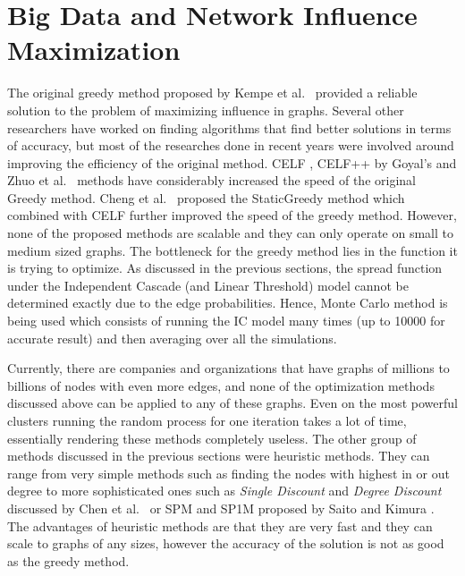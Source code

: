 \documentclass[english]{tktltiki}
\begin{document}
\newpage

\section{Big Data and Network Influence Maximization}
\label{sec:bigdatanetworkinfluelncemaximization}
The original greedy method proposed by Kempe et al.\ \cite{kempe03} provided a reliable solution to the problem of maximizing influence in graphs. 
Several other researchers have worked on finding algorithms that find better solutions in terms of accuracy, but most of the researches done in recent years were involved around improving the efficiency of the original method. 
CELF \cite{leskovec07},  CELF++ by Goyal's \cite{goyal112} and Zhuo et al.\ \cite{zhuo13} methods have considerably increased the speed of the original Greedy method. 
Cheng et al.\ \cite{cheng13} proposed the StaticGreedy method which combined with CELF further improved the speed of the greedy method.  However, none of the proposed methods are scalable and they can only operate on small to medium sized graphs. 
The bottleneck for the greedy method lies in the function it is trying to optimize.  
As discussed in the previous sections, the spread function under the Independent Cascade (and Linear Threshold) model cannot be determined exactly due to the edge probabilities. 
Hence, Monte Carlo method is being used which consists of running the IC model many times (up to 10000 for accurate result) and then averaging over all the simulations. 

Currently, there are companies and organizations that have graphs of millions to billions of nodes with even more edges, and none of the optimization methods discussed above can be applied to any of these graphs. 
Even on the most powerful clusters running the random process for one iteration takes a lot of time, essentially rendering these methods completely useless. 
The other group of methods discussed in the previous sections were heuristic methods. 
They can range from very simple methods such as finding the nodes with highest in or out degree to more sophisticated ones such as \textit{Single Discount} and \textit{Degree Discount} discussed by Chen et al.\ \cite{chen09} or SPM and SP1M proposed by Saito and Kimura \cite{kimura06}. 
The advantages of heuristic methods are that they are very fast and they can scale to graphs of any sizes, however the accuracy of the solution is not as good as the greedy method. 
\end{document}
